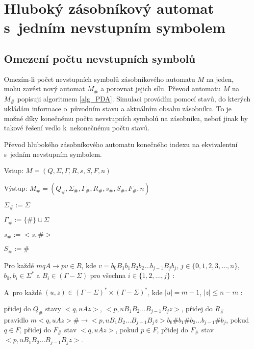 \chapter{Hluboký zásobníkový automat s~jedním nevstupním symbolem}


\section{Omezení počtu nevstupních symbolů}

Omezím-li počet nevstupních symbolů zásobníkového automatu $M$ na jeden, mohu zavést nový automat $M_\#$ a porovnat jejich sílu. Převod automatu $M$ na  $M_\#$ popisuji algoritmem \ref{alg_PDA}. Simulaci provádím pomocí stavů, do kterých ukládám informace o~původním stavu a aktuálním obsahu zásobníku. To je možné díky konečnému počtu nevstupních symbolů na zásobníku, neboť jinak by takové řešení vedlo k~nekonečnému počtu stavů.

\begin{Alg} \label{alg_PDA}
Převod hlubokého zásobníkového automatu konečného indexu na ekvivalentní s~jedním nevstupním symbolem.

\begin{list}{}{\setlength\parsep{0cm} \setlength\itemsep{0cm} \setlength\leftmargin{1em}}
   \item Vstup: $M = (Q,\Sigma,\Gamma, R, s, S, F, n)$ 
   \item Výstup: $M_\# = (Q_\#,{\Sigma}_\#,{\Gamma}_\#, R_\#, s_\#,  S_\#, F_\#, n)$ \medskip
  
  \item ${\Sigma}_\# := \Sigma$
  \item ${\Gamma}_\# :=\{\#\} \cup \Sigma$
  \item $s_\# := <s,\#>$
  \item $S_\# := \# $ \medskip

  \item Pro každé $mqA \rightarrow pv \in R$, kde $v = b_0 B_1 b_1 B_2 b_2 \dots b_{j-1} B_{j} b_j$, $j \in \{0,1,2,3,\dots,n\}$, $b_0,b_i \in {\Sigma}^*$ a $B_i \in (\Gamma - \Sigma)$ pro všechna $i \in \{1,2,\dots,j\}$ : \smallskip

  \subitem A~pro každé $(u,z) \in (\Gamma - \Sigma)^* \times (\Gamma - \Sigma)^*$, kde $|u|=m-1$, $|z|\le n-m$ : \smallskip

  \subsubitem přidej do $Q_\#$ stavy $<q, u A z>$, $<p, u B_1 B_2 \dots B_{j-1} B_{j} z>$,
  \subsubitem přidej do $R_\#$ pravidlo $m <q, u A z> \# \rightarrow <p, u B_1 B_2 \dots B_{j-1} B_{j} z> b_0 \# b_1 \# b_2 \dots b_{j-1} \# b_j $,
  \subsubitem pokud $q \in F$, přidej do $F_\#$ stav $<q, u A z>$,
  \subsubitem pokud $p \in F$, přidej do $F_\#$ stav $<p, u B_1 B_2 \dots B_{j-1} B_{j} z>$.

\end{list}
\end{Alg}

